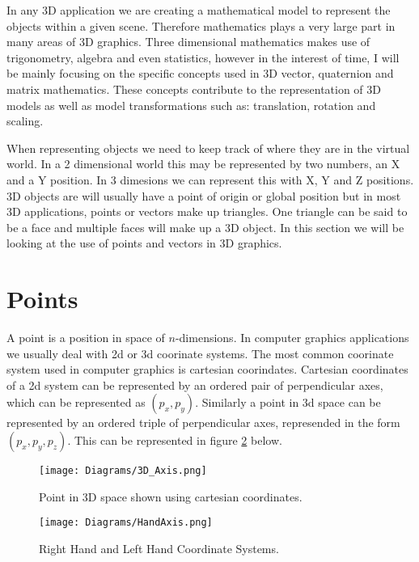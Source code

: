 In any 3D application we are creating a mathematical model to represent the objects within a given scene. Therefore mathematics plays a very large part in many areas of 3D graphics. Three dimensional mathematics makes use of trigonometry, algebra and even statistics, however in the interest of time, I will be mainly focusing on the specific concepts used in 3D vector, quaternion and matrix mathematics. These concepts contribute to the representation of 3D models as well as model transformations such as: translation, rotation and scaling.  

When representing objects we need to keep track of where they are in the virtual world. In a 2 dimensional world this may be represented by two numbers, an X and a Y position. In 3 dimesions we can represent this with X, Y and Z positions. 3D objects are will usually have a point of origin or global position but in most 3D applications, points or vectors make up triangles. One triangle can be said to be a face and multiple faces will make up a 3D object. In this section we will be looking at the use of points and vectors in 3D graphics.

\section{Points} 

A point is a position in space of $n$-dimensions. In computer graphics applications we usually deal with \acrshort{2d} or \acrshort{3d} coorinate systems. The most common coorinate system used in computer graphics is cartesian coorindates. Cartesian coordinates of a \acrshort{2d} system can be represented by an ordered pair of perpendicular axes, which can be represented as $(p_x, p_y)$. Similarly a point in \acrshort{3d} space can be represented by an ordered triple of perpendicular axes, represended in the form $(p_x, p_y, p_z)$. This can be represented in figure \ref{3DAxisFigure} below.

\begin{figure}[htbp]
	\raggedright
	{\centering
		\vspace{7px}
		\texttt{[image: Diagrams/3D\_Axis.png]}
		\caption{Point in 3D space shown using cartesian coordinates.}
		\label{3DAxisFigure}
	}
\end{figure}
\FloatBarrier

\begin{figure}[htbp]
	\raggedright
	{\centering
		\vspace{7px}
		\texttt{[image: Diagrams/HandAxis.png]}
		\caption{Right Hand and Left Hand Coordinate Systems.}
		\label{3DAxisFigure}
	}
\end{figure}
\FloatBarrier

